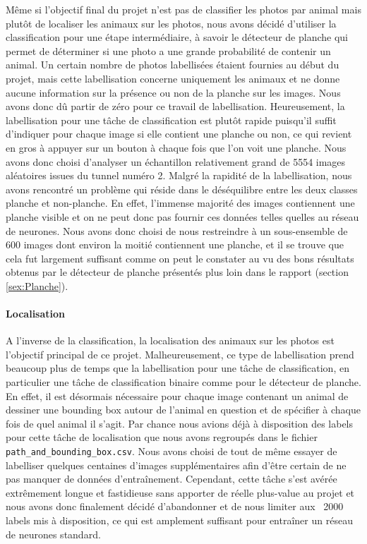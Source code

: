Même si l'objectif final du projet n'est pas de classifier les photos par animal mais plutôt de localiser les animaux sur les photos, nous avons décidé d'utiliser la classification pour une étape intermédiaire, à savoir le détecteur de planche qui permet de déterminer si une photo a une grande probabilité de contenir un animal. Un certain nombre de photos labellisées étaient fournies au début du projet, mais cette labellisation concerne uniquement les animaux et ne donne aucune information sur la présence ou non de la planche sur les images. Nous avons donc dû partir de zéro pour ce travail de labellisation. Heureusement, la labellisation pour une tâche de classification est plutôt rapide puisqu'il suffit d'indiquer pour chaque image si elle contient une planche ou non, ce qui revient en gros à appuyer sur un bouton à chaque fois que l'on voit une planche. Nous avons donc choisi d'analyser un échantillon relativement grand de 5554 images aléatoires issues du tunnel numéro 2. Malgré la rapidité de la labellisation, nous avons rencontré un problème qui réside dans le déséquilibre entre les deux classes planche et non-planche. En effet, l'immense majorité des images contiennent une planche visible et on ne peut donc pas fournir ces données telles quelles au réseau de neurones. Nous avons donc choisi de nous restreindre à un sous-ensemble de 600 images dont environ la moitié contiennent une planche, et il se trouve que cela fut largement suffisant comme on peut le constater au vu des bons résultats obtenus par le détecteur de planche présentés plus loin dans le rapport (section \ref{sex:Planche}).

\paragraph{Localisation}

A l'inverse de la classification, la localisation des animaux sur les photos est l'objectif principal de ce projet. Malheureusement, ce type de labellisation prend beaucoup plus de temps que la labellisation pour une tâche de classification, en particulier une tâche de classification binaire comme pour le détecteur de planche. En effet, il est désormais nécessaire pour chaque image contenant un animal de dessiner une bounding box autour de l'animal en question et de spécifier à chaque fois de quel animal il s'agit. Par chance nous avions déjà à disposition des labels pour cette tâche de localisation que nous avons regroupés dans le fichier \verb|path_and_bounding_box.csv|. Nous avons choisi de tout de même essayer de labelliser quelques centaines d'images supplémentaires afin d'être certain de ne pas manquer de données d'entraînement. Cependant, cette tâche s'est avérée extrêmement longue et fastidieuse sans apporter de réelle plus-value au projet et nous avons donc finalement décidé d'abandonner et de nous limiter aux ~2000 labels mis à disposition, ce qui est amplement suffisant pour entraîner un réseau de neurones standard. 

